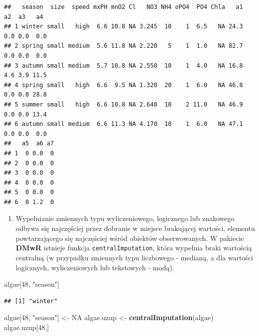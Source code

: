 \documentclass[
]{book}
\newenvironment{Shaded}{\begin{snugshade}}{\end{snugshade}}
\newcommand{\DataTypeTok}[1]{\textcolor[rgb]{0.13,0.29,0.53}{#1}}
\newcommand{\DecValTok}[1]{\textcolor[rgb]{0.00,0.00,0.81}{#1}}
\newcommand{\KeywordTok}[1]{\textcolor[rgb]{0.13,0.29,0.53}{\textbf{#1}}}
\newcommand{\NormalTok}[1]{#1}
\newcommand{\OperatorTok}[1]{\textcolor[rgb]{0.81,0.36,0.00}{\textbf{#1}}}
\newcommand{\OtherTok}[1]{\textcolor[rgb]{0.56,0.35,0.01}{#1}}
\newcommand{\StringTok}[1]{\textcolor[rgb]{0.31,0.60,0.02}{#1}}
\providecommand{\tightlist}{%
  \setlength{\itemsep}{0pt}\setlength{\parskip}{0pt}}
\theoremstyle{plain}
\theoremstyle{definition}
\theoremstyle{definition}
\theoremstyle{definition}
\theoremstyle{definition}
\theoremstyle{remark}
\begin{document}
\begin{verbatim}
##   season  size  speed mxPH mnO2 Cl   NO3 NH4 oPO4  PO4 Chla   a1  a2  a3   a4
## 1 winter small   high  6.6 10.8 NA 3.245  10    1  6.5   NA 24.3 0.0 0.0  0.0
## 2 spring small medium  5.6 11.8 NA 2.220   5    1  1.0   NA 82.7 0.0 0.0  0.0
## 3 autumn small medium  5.7 10.8 NA 2.550  10    1  4.0   NA 16.8 4.6 3.9 11.5
## 4 spring small   high  6.6  9.5 NA 1.320  20    1  6.0   NA 46.8 0.0 0.0 28.8
## 5 summer small   high  6.6 10.8 NA 2.640  10    2 11.0   NA 46.9 0.0 0.0 13.4
## 6 autumn small medium  6.6 11.3 NA 4.170  10    1  6.0   NA 47.1 0.0 0.0  0.0
##   a5  a6 a7
## 1  0 0.0  0
## 2  0 0.0  0
## 3  0 0.0  0
## 4  0 0.0  0
## 5  0 0.0  0
## 6  0 1.2  0
\end{verbatim}

\begin{Shaded}
\end{Shaded}

\begin{enumerate}
\def\labelenumi{\arabic{enumi}.}
\setcounter{enumi}{2}
\tightlist
\item
  Wypełnianie zmiennych typu wyliczeniowego, logicznego lub znakowego odbywa się najczęściej przez dobranie w miejsce brakującej wartości, elementu powtarzającego się najczęściej wśród obiektów obserwowanych. W pakiecie \textbf{DMwR} istnieje funkcja \texttt{centralImputation}, która wypełnia braki wartością centralną (w przypadku zmiennych typu liczbowego - medianą, a dla wartości logicznych, wyliczeniowych lub tekstowych - modą).
\end{enumerate}

\begin{Shaded}
\begin{Highlighting}[]
\NormalTok{algae[}\DecValTok{48}\NormalTok{, }\StringTok{"season"}\NormalTok{]}
\end{Highlighting}
\end{Shaded}

\begin{verbatim}
## [1] "winter"
\end{verbatim}

\begin{Shaded}
\begin{Highlighting}[]
\NormalTok{algae[}\DecValTok{48}\NormalTok{, }\StringTok{"season"}\NormalTok{] <-}\StringTok{ }\OtherTok{NA}
\NormalTok{algae.uzup <-}\StringTok{ }\KeywordTok{centralImputation}\NormalTok{(algae)}
\NormalTok{algae.uzup[}\DecValTok{48}\NormalTok{,]}
\end{Highlighting}
\end{Shaded}
\end{document}
